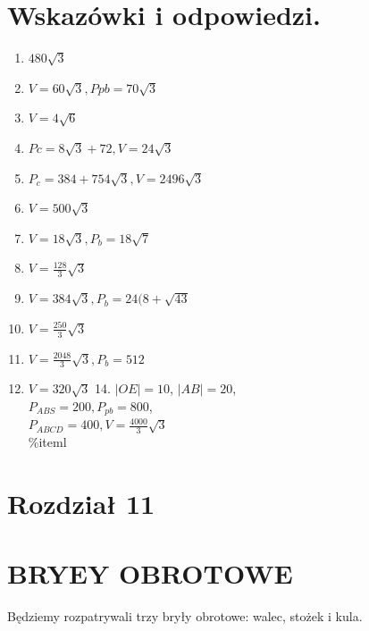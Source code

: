 \documentclass[10pt]{article}
\begin{document}
\section*{Wskazówki i odpowiedzi.}
\begin{enumerate}
  \item \(480 \sqrt{3}\)
  \item \(V=60 \sqrt{3}, P p b=70 \sqrt{3}\)
  \item \(V=4 \sqrt{6}\)
  \item \(P c=8 \sqrt{3}+72, V=24 \sqrt{3}\)
  \item \(P_{c}=384+754 \sqrt{3}, V=2496 \sqrt{3}\)
  \item \(V=500 \sqrt{3}\)
  \item \(V=18 \sqrt{3}, P_{b}=18 \sqrt{7}\)
  \item \(V=\frac{128}{3} \sqrt{3}\)
  \item \(V=384 \sqrt{3}, P_{b}=24(8+\sqrt{43}\)
  \item \(V=\frac{250}{3} \sqrt{3}\)
  \item \(V=\frac{2048}{3} \sqrt{3}, P_{b}=512\)
  \item \(V=320 \sqrt{3}\) 14. \(|O E|=10\), \(|A B|=20\),\\
\(P_{A B S}=200, P_{p b}=800\),\\
\(P_{A B C D}=400, V=\frac{4000}{3} \sqrt{3}\)\\
\%iteml
\end{enumerate}

\section*{Rozdział 11}
\section*{BRYEY OBROTOWE}
Będziemy rozpatrywali trzy bryły obrotowe: walec, stożek i kula.
\end{document}
